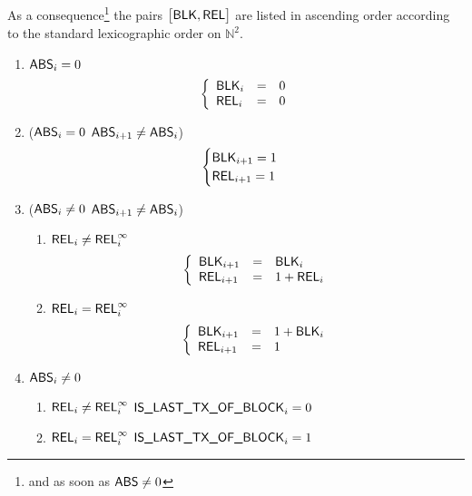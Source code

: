 As a consequence\footnote{and as soon as $\textsf{ABS} \neq 0$} the pairs $\big[\textsf{BLK}, \textsf{REL}\big]$ are listed in ascending order according to the standard lexicographic order on $\mathbb{N}^2$.
\begin{enumerate}[resume]
	\item \If $\textsf{ABS}_{i} = 0$ \Then
		\[
			\left\{\begin{array}{lcl}
				\textsf{BLK}_{i}   & = & 0 \\
				\textsf{REL}_{i}      & = & 0 \\
			\end{array}\right.
		\]
	\item \If \big($\textsf{ABS}_{i} = 0$ \et $\textsf{ABS}_{i + 1} \neq \textsf{ABS}_{i}$\big) \Then 
		\[
			\begin{cases}
				\textsf{BLK}_{i + 1} = 1 \\
				\textsf{REL}_{i + 1} = 1 \\
			\end{cases}
		\]
	\item \If \big($\textsf{ABS}_{i} \neq 0$ \et $\textsf{ABS}_{i + 1} \neq \textsf{ABS}_{i}$\big) \Then
		\begin{enumerate}
			\item \If $\textsf{REL}_{i} \neq \textsf{REL}^\infty_{i}$ \Then
				\[
					\left\{\begin{array}{lcl}
						\textsf{BLK}_{i + 1} & = & \textsf{BLK}_{i} \\
						\textsf{REL}_{i + 1}    & = & 1 + \textsf{REL}_{i} \\
					\end{array}\right.
				\]
			\item \If $\textsf{REL}_{i} =    \textsf{REL}^\infty_{i}$ \Then 
				\[
					\left\{\begin{array}{lcl}
						\textsf{BLK}  _{i + 1} & = & 1 + \textsf{BLK}_{i} \\
						\textsf{REL} _{i + 1} & = & 1              \\
					\end{array}\right.
				\]
		\end{enumerate}
	\item \If $\textsf{ABS}_{i} \neq 0$ \Then
		\begin{enumerate}
			\item \If $\textsf{REL}_{i} \neq \textsf{REL}^\infty_{i}$ \Then $\textsf{IS\_LAST\_TX\_OF\_BLOCK}_{i} = 0$
			\item \If $\textsf{REL}_{i} =    \textsf{REL}^\infty_{i}$ \Then $\textsf{IS\_LAST\_TX\_OF\_BLOCK}_{i} = 1$
		\end{enumerate}
\end{enumerate}
